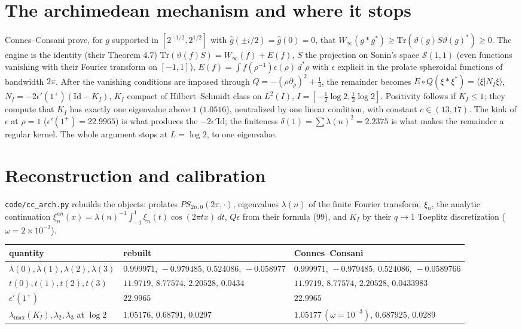 \documentclass[11pt]{article}
\begin{document}
\section{The archimedean mechanism and where it stops}
Connes--Consani prove, for $g$ supported in $[2^{-1/2},2^{1/2}]$ with $\hat g(\pm i/2)=\hat g(0)=0$, that $W_\infty(g*g^*)\ge\mathrm{Tr}(\vartheta(g)S\vartheta(g)^*)\ge0$. The engine is the identity (their Theorem 4.7) $\mathrm{Tr}(\vartheta(f)S)=W_\infty(f)+E(f)$, $S$ the projection on Sonin's space $\mathcal S(1,1)$ (even functions vanishing with their Fourier transform on $[-1,1]$), $E(f)=\int f(\rho^{-1})\epsilon(\rho)\,d^*\rho$ with $\epsilon$ explicit in the prolate spheroidal functions of bandwidth $2\pi$. After the vanishing conditions are imposed through $Q=-(\rho\partial_\rho)^2+\tfrac14$, the remainder becomes $E\circ Q(\xi*\xi^*)=\langle\xi|N_I\xi\rangle$, $N_I=-2\epsilon'(1^+)(\mathrm{Id}-K_I)$, $K_I$ compact of Hilbert--Schmidt class on $L^2(I)$, $I=[-\tfrac12\log2,\tfrac12\log2]$. Positivity follows if $K_I\le1$; they compute that $K_I$ has exactly one eigenvalue above $1$ ($1.0516$), neutralized by one linear condition, with constant $c\in(13,17)$. The kink of $\epsilon$ at $\rho=1$ ($\epsilon'(1^+)=22.9965$) is what produces the $-2\epsilon'\mathrm{Id}$; the finiteness $\delta(1)=\sum\lambda(n)^2=2.2375$ is what makes the remainder a regular kernel. The whole argument stops at $L=\log 2$, to one eigenvalue.

\section{Reconstruction and calibration}
\texttt{code/cc\_arch.py} rebuilds the objects: prolates $PS_{2n,0}(2\pi,\cdot)$, eigenvalues $\lambda(n)$ of the finite Fourier transform, $\xi_n$, the analytic continuation $\xi_n^{an}(x)=\lambda(n)^{-1}\int_{-1}^1\xi_n(t)\cos(2\pi tx)\,dt$, $Q\epsilon$ from their formula (99), and $K_I$ by their $q\to1$ Toeplitz discretization ($\omega=2\times10^{-3}$).
\begin{center}\small
\begin{tabular}{lll}\toprule
quantity & rebuilt & Connes--Consani\\\midrule
$\lambda(0),\lambda(1),\lambda(2),\lambda(3)$ & $0.999971,\,-0.979485,\,0.524086,\,-0.058977$ & $0.999971,\,-0.979485,\,0.524086,\,-0.0589766$\\
$t(0),t(1),t(2),t(3)$ & $11.9719,\,8.77574,\,2.20528,\,0.0434$ & $11.9719,\,8.77574,\,2.20528,\,0.0433983$\\
$\epsilon'(1^+)$ & $22.9965$ & $22.9965$\\
$\lambda_{\max}(K_I),\lambda_2,\lambda_3$ at $\log 2$ & $1.05176,\,0.68791,\,0.0297$ & $1.05177\,(\omega=10^{-3}),\,0.687925,\,0.0289$\\\bottomrule
\end{tabular}
\end{center}
\end{document}
